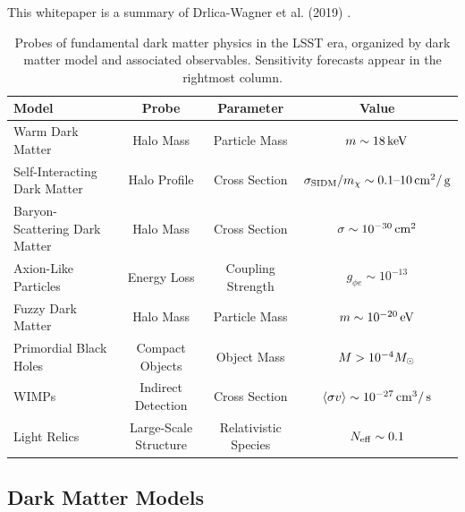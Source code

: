 \documentclass[12pt]{article}
\begin{document}
This whitepaper is a summary of Drlica-Wagner et al. (2019) \citep{drlica-wagner_2019_lsst_dark_matter}.

\begin{table}[ht]
\footnotesize
\begin{center}
\begin{tabular}{l c c c}
\hline 
Model & Probe & Parameter & Value \\
\hline 
\hline
Warm Dark Matter  & Halo Mass & Particle Mass & $m \sim 18 \mathrm{\,keV}$ \\
Self-Interacting Dark Matter & Halo Profile & Cross Section & $\sigma_{\rm SIDM}/m_\chi \sim 0.1\text{--}10\mathrm{\,cm}^2/\mathrm{\,g}$ \\
Baryon-Scattering Dark Matter & Halo Mass & Cross Section & $\sigma \sim 10^{-30} \mathrm{\,cm}^2$ \\
Axion-Like Particles & Energy Loss & Coupling Strength & $g_{\phi e} \sim 10^{-13} $ \\
Fuzzy Dark Matter & Halo Mass & Particle Mass & $m \sim 10^{-20} \mathrm{\,eV}$  \\
Primordial Black Holes  & Compact Objects & Object Mass & $M > 10^{-4} M_\odot$ \\
WIMPs & Indirect Detection & Cross Section & $\langle \sigma v \rangle \sim 10^{-27} \mathrm{\,cm}^3/\mathrm{\,s}$ \\
Light Relics & Large-Scale Structure & Relativistic Species & $N_{\rm eff} \sim 0.1$ \\[+0.5em]
\hline
\end{tabular}
\end{center}
\vspace{-1em}
\caption{\label{tab:models} Probes of fundamental dark matter physics in the LSST era, organized by dark matter model and associated observables. Sensitivity forecasts appear in the rightmost column.}


\end{table}

\vspace{-1em} \subsection*{Dark Matter Models} \vspace{-0.5em}
\end{document}

